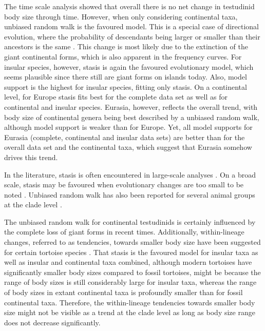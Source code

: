 The time scale analysis showed that overall there is no net change in testudinid body size through time. However, when only considering continental taxa, unbiased random walk is the favoured model. This is a special case of directional evolution, where the probability of descendants being larger or smaller than their ancestors is the same \citep{Hunt2010,Smith2016}.
This change is most likely due to the extinction of the giant continental forms, which is also apparent in the frequency curves. 
For insular species, however, stasis is again the favoured evolutionary model, which seems plausible since there still are giant forms on islands today. Also, model support is the highest for insular species, fitting only stasis.
On a continental level, for Europe stasis fits best for the complete data set as well as for continental and insular species.
Eurasia, however, reflects the overall trend, with body size of continental genera being best described by a unbiased random walk, although model support is weaker than for Europe.
Yet, all model supports for Eurasia (complete, continental and insular data sets) are better than for the overall data set and the continental taxa, which suggest that Eurasia somehow drives this trend.

In the literature, stasis is often encountered in large-scale analyses \citep{Smith2016, Hunt2006,Hunt2007,Hunt2015}. On a broad scale, stasis may be favoured when evolutionary changes are too small to be noted \citep{Hunt2015}.
Unbiased random walk has also been reported for several animal groups at the clade level \citep{Smith2016,Pimiento2015}. %

The unbiased random walk for continental testudinids is certainly influenced by the complete loss of giant forms in recent times. 
Additionally, within-lineage changes, referred to as tendencies, towards smaller body size have been suggested for certain tortoise species \citep{Klein2000,Steele2005,Franz2005,Speth2002}.
That stasis is the favoured model for insular taxa as well as insular and continental taxa combined, although modern tortoises have significantly smaller body sizes compared to fossil tortoises, might be because the range of body sizes is still considerably large for insular taxa, whereas the range of body sizes in extant continental taxa is profoundly smaller than for fossil continental taxa.
Therefore, the within-lineage tendencies towards smaller body size might not be visible as a trend at the clade level as long as body size range does not decrease significantly.

